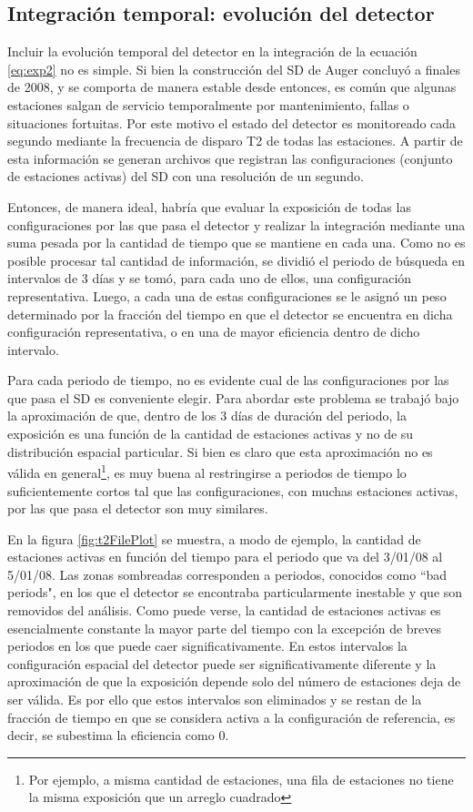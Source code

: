 	\subsection{Integración temporal: evolución del detector}
	
	Incluir la evolución temporal del detector en la integración de la ecuación \ref{eq:exp2} no es simple.
	Si bien la construcción del SD de Auger concluyó a finales de 2008, y se comporta de manera estable desde entonces, es común que algunas estaciones salgan de servicio temporalmente por mantenimiento, fallas o situaciones fortuitas.
	Por este motivo el estado del detector es monitoreado cada segundo mediante la frecuencia de disparo T2 de todas las estaciones.
	A partir de esta información se generan archivos que registran las configuraciones (conjunto de estaciones activas) del SD con una resolución de un segundo.
	
	Entonces, de manera ideal, habría que evaluar la exposición de todas las configuraciones por las que pasa el detector y realizar la integración mediante una suma pesada por la cantidad de tiempo que se mantiene en cada una.
	Como no es posible procesar tal cantidad de información, se dividió el periodo de búsqueda en intervalos de 3 días y se tomó, para cada uno de ellos, una configuración representativa. 
	Luego, a cada una de estas configuraciones se le asignó un peso determinado por la fracción del tiempo en que el detector se encuentra en dicha configuración representativa, o en una de mayor eficiencia dentro de dicho intervalo.
	
	Para cada periodo de tiempo, no es evidente cual de las configuraciones por las que pasa el SD es conveniente elegir.
	Para abordar este problema se trabajó bajo la aproximación de que, dentro de los 3 días de duración del periodo, la exposición es una función de la cantidad de estaciones activas y no de su distribución espacial particular.
	Si bien es claro que esta aproximación no es válida en general\footnote{Por ejemplo, a misma cantidad de estaciones, una fila de estaciones no tiene la misma exposición que un arreglo cuadrado}, es muy buena al restringirse a periodos de tiempo lo suficientemente cortos tal que las configuraciones, con muchas estaciones activas, por las que pasa el detector son muy similares.
	
	En la figura \ref{fig:t2FilePlot} se muestra, a modo de ejemplo, la cantidad de estaciones activas en función del tiempo para el periodo que va del 3/01/08 al 5/01/08. Las zonas sombreadas corresponden a periodos, conocidos como ``bad periods", en los que el detector se encontraba particularmente inestable y que son removidos del análisis.
	Como puede verse, la cantidad de estaciones activas es esencialmente constante la mayor parte del tiempo con la excepción de breves periodos en los que puede caer significativamente.
	En estos intervalos la configuración espacial del detector puede ser significativamente diferente y la aproximación de que la exposición depende solo del número de estaciones deja de ser válida.
	Es por ello que estos intervalos son eliminados y se restan de la fracción de tiempo en que se considera activa a la configuración de referencia, es decir, se subestima la eficiencia como 0.
	
